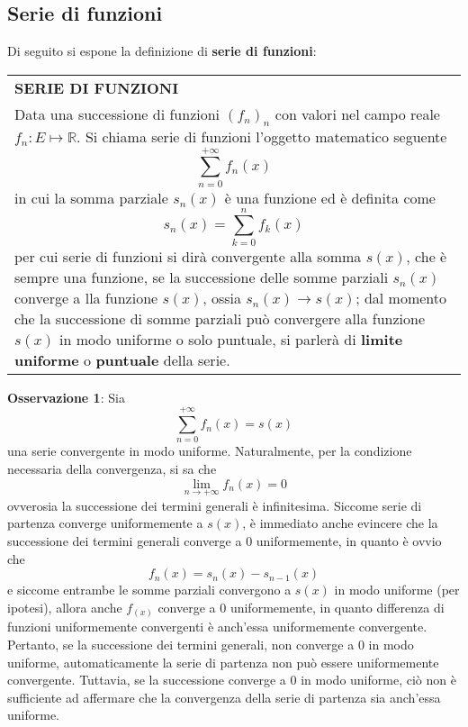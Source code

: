 \documentclass[a4paper]{extarticle}
\renewcommand\arraystretch{}
\begin{document}
\vspace{1em}
\noindent
\subsection{Serie di funzioni}
Di seguito si espone la definizione di \textbf{serie di funzioni}:

\vspace{1em}
\setlength{\tabcolsep}{14pt}
\renewcommand{\arraystretch}{2}
\noindent
\begin{tabularx}{\textwidth}{@{}|P|@{}}
    \hline
    {\textbf{SERIE DI FUNZIONI}}\\
    \parbox{\linewidth}{Data una successione di funzioni $(f_n)_n$ con valori nel campo reale $f_n : E \longmapsto \mathbb{R}$. Si chiama serie di funzioni l'oggetto matematico seguente
    \[\sum_{n=0}^{+\infty} f_n(x)\]
    in cui la somma parziale $s_n(x)$ è una funzione ed è definita come
    \[s_n(x) = \sum_{k=0}^n f_k(x)\]
    per cui serie di funzioni si dirà convergente alla somma $s(x)$, che è sempre una funzione, se la successione delle somme parziali $s_n(x)$ converge a lla funzione $s(x)$, ossia $s_n(x) \to s(x)$; dal momento che la successione di somme parziali può convergere alla funzione $s(x)$ in modo uniforme o solo puntuale, si parlerà di \textbf{limite uniforme} o \textbf{puntuale} della serie.\vspace{3mm}}\\
    \hline
\end{tabularx}

\vspace{1em}
\noindent
\textbf{Osservazione 1}: Sia
\[\sum_{n=0}^{+\infty} f_n(x) = s(x)\]
una serie convergente in modo uniforme. Naturalmente, per la condizione necessaria della convergenza, si sa che
\[\lim_{n \to +\infty} f_n(x) = 0\]
ovverosia la successione dei termini generali è infinitesima. Siccome serie di partenza converge uniformemente a $s(x)$, è immediato anche evincere che la successione dei termini generali converge a $0$ uniformemente, in quanto è ovvio che
\[f_n(x) = s_n(x) - s_{n-1}(x)\]
e siccome entrambe le somme parziali convergono a $s(x)$ in modo uniforme (per ipotesi), allora anche $f_(x)$ converge a $0$ uniformemente, in quanto differenza di funzioni uniformemente convergenti è anch'essa uniformemente convergente.\\
Pertanto, se la successione dei termini generali, non converge a $0$ in modo uniforme, automaticamente la serie di partenza non può essere uniformemente convergente. Tuttavia, se la successione converge a $0$ in modo uniforme, ciò non è sufficiente ad affermare che la convergenza della serie di partenza sia anch'essa uniforme.
\end{document}
